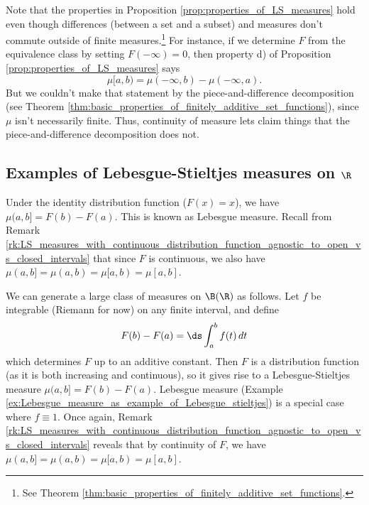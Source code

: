 \documentclass{article} %
\begin{document}
\begin{remark}
Note that the properties in Proposition \ref{prop:properties_of_LS_measures} hold even though differences (between a set and a subset) and measures don't commute outside of finite measures.\footnote{See Theorem \ref{thm:basic_properties_of_finitely_additive_set_functions}.}  For instance, if we determine $F$ from the equivalence class by setting $F(-\infty)=0$, then property d) of Proposition \ref{prop:properties_of_LS_measures} says 
\[  \mu[a,b) = \mu(-\infty, b) - \mu(-\infty, a).\]
But we couldn't make that statement by the piece-and-difference decomposition (see Theorem \ref{thm:basic_properties_of_finitely_additive_set_functions}), since $\mu$ isn't necessarily finite.  Thus, continuity of measure lets claim things that the piece-and-difference decomposition does not.
\end{remark}



\subsection{Examples of Lebesgue-Stieltjes measures on $\R$}

\begin{example}{}
Under the identity distribution function ($F(x)=x$), we have $\mu(a,b]=F(b)-F(a)$.  This is known as Lebesgue measure.  Recall from Remark \ref{rk:LS_measures_with_continuous_distribution_function_agnostic_to_open_vs_closed_intervals} that since $F$ is continuous, we also have $\mu(a,b]=\mu(a,b)=\mu[a,b)=\mu[a,b]$.
\label{ex:Lebesgue_measure_as_example_of_Lebesgue_stieltjes} 
\end{example}

\begin{example}{}
We can generate a large class of measures on $\B(\R)$ as follows.  Let $f$ be integrable (Riemann for now) on any finite interval, and define
\[ F(b) - F(a) = \ds\int_{a}^b f(t) \, dt\]
which determines $F$ up to an additive constant.   Then $F$ is a distribution function (as it is both increasing and continuous), so it gives rise to a Lebesgue-Stieltjes measure $\mu(a,b] = F(b) - F(a)$.  Lebesgue measure (Example \ref{ex:Lebesgue_measure_as_example_of_Lebesgue_stieltjes}) is a special case where $f \equiv 1$.  Once again, Remark \ref{rk:LS_measures_with_continuous_distribution_function_agnostic_to_open_vs_closed_intervals} reveals that by continuity of $F$, we have $\mu(a,b]=\mu(a,b)=\mu[a,b)=\mu[a,b]$.  
\end{example}
\end{document}
